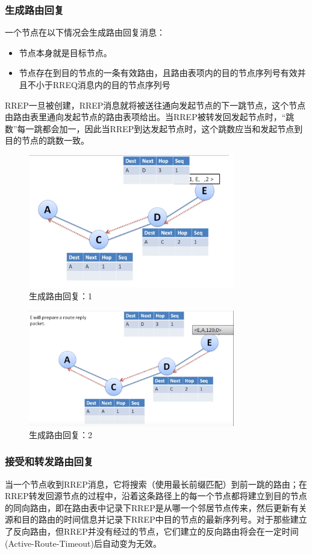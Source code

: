 \documentclass[12pt,a4paper]{article}
\begin{document}
\subsubsection{生成路由回复}
一个节点在以下情况会生成路由回复消息：
\begin{itemize}
	\item 节点本身就是目标节点。
	\item 节点存在到目的节点的一条有效路由，且路由表项内的目的节点序列号有效并且不小于RREQ消息内的目的节点序列号
\end{itemize}

RREP一旦被创建，RREP消息就将被送往通向发起节点的下一跳节点，这个节点由路由表里通向发起节点的路由表项给出。当RREP被转发回发起节点时，“跳数”每一跳都会加一，因此当RREP到达发起节点时，这个跳数应当和发起节点到目的节点的跳数一致。

\begin{figure}[htb]
\centering
\includegraphics[width=9cm]{gen_route_reply_1}
\caption{生成路由回复：1}
\end{figure}

\begin{figure}[htb]
\centering
\includegraphics[width=9cm]{gen_route_reply_2}
\caption{生成路由回复：2}
\end{figure}

\subsubsection{接受和转发路由回复}
当一个节点收到RREP消息，它将搜索（使用最长前缀匹配）到前一跳的路由；在RREP转发回源节点的过程中，沿着这条路径上的每一个节点都将建立到目的节点的同向路由，即在路由表中记录下RREP是从哪一个邻居节点传来，然后更新有关源和目的路由的时间信息并记录下RREP中目的节点的最新序列号。对于那些建立了反向路由，但RREP并没有经过的节点，它们建立的反向路由将会在一定时间(Active-Route-Timeout)后自动变为无效。
\end{document}
